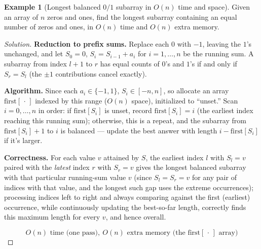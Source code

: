 \documentclass[11pt]{article}
\theoremstyle{definition}
\newtheorem{example}{Example}[section]
\begin{document}
\begin{example}[Longest balanced $0/1$ subarray in $O(n)$ time and space]
Given an array of $n$ zeros and ones, find the longest subarray containing an equal number of zeros and ones, in $O(n)$ time and $O(n)$ extra memory.
\end{example}
\begin{proof}[Solution]
\textbf{Reduction to prefix sums.} Replace each $0$ with $-1$, leaving the $1$'s unchanged, and let $S_0=0$, $S_i=S_{i-1}+a_i$ for $i=1,\dots,n$ be the running sum. A subarray from index $l+1$ to $r$ has equal counts of $0$'s and $1$'s if and only if $S_r=S_l$ (the $\pm1$ contributions cancel exactly).

\textbf{Algorithm.} Since each $a_i\in\{-1,1\}$, $S_i\in[-n,n]$, so allocate an array $\mathrm{first}[\,\cdot\,]$ indexed by this range ($O(n)$ space), initialized to ``unset.'' Scan $i=0,\dots,n$ in order: if $\mathrm{first}[S_i]$ is unset, record $\mathrm{first}[S_i]=i$ (the earliest index reaching this running sum); otherwise, this is a repeat, and the subarray from $\mathrm{first}[S_i]+1$ to $i$ is balanced — update the best answer with length $i-\mathrm{first}[S_i]$ if it's larger.

\textbf{Correctness.} For each value $v$ attained by $S$, the earliest index $l$ with $S_l=v$ paired with the \emph{latest} index $r$ with $S_r=v$ gives the longest balanced subarray with that particular running-sum value $v$ (since $S_l=S_r=v$ for any pair of indices with that value, and the longest such gap uses the extreme occurrences); processing indices left to right and always comparing against the first (earliest) occurrence, while continuously updating the best-so-far length, correctly finds this maximum length for every $v$, and hence overall.

\[
\boxed{O(n)\text{ time (one pass)},\ O(n)\text{ extra memory (the }\mathrm{first}[\,\cdot\,]\text{ array)}}
\]
\end{proof}
\end{document}
